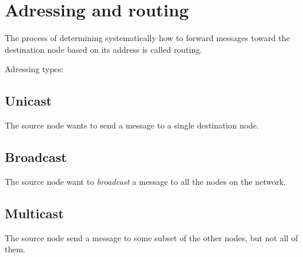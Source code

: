 \section{Adressing and routing}

The process of determining systematically how to forward 
messages toward the destination node based on its 
address is called routing. \cite{PetersonDavie:2003}

Adressing types: \\

	\subsection{Unicast}
	The source node wants to send a message to a single destination node.
	
	\subsection{Broadcast}
	The source node want to \emph{broadcast} a message to all the 
	nodes on the network.
	
	\subsection{Multicast}
	The source node send a message to some subset of the 
	other nodes, but not all of them.
	

	
	
	
